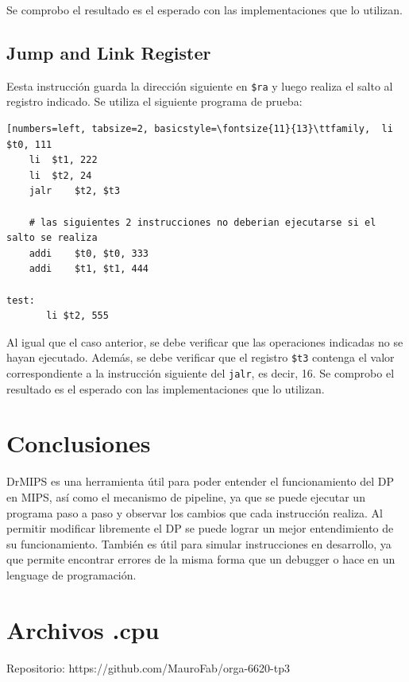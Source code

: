 \documentclass[11pt,a4paper, spanish]{article}
\begin{document}
Se comprobo el resultado es el esperado con las implementaciones que lo utilizan.

\subsection{Jump and Link Register}

Eesta instrucción guarda la dirección siguiente en \texttt{\$ra} y luego realiza el salto al registro
indicado. Se utiliza el siguiente programa de prueba:

\begin{lstlisting}[numbers=left, tabsize=2, basicstyle=\fontsize{11}{13}\ttfamily, 	li	$t0, 111
	li	$t1, 222
	li	$t2, 24
	jalr	$t2, $t3

	# las siguientes 2 instrucciones no deberian ejecutarse si el salto se realiza
	addi	$t0, $t0, 333
	addi	$t1, $t1, 444

test:
       li $t2, 555
\end{lstlisting}

Al igual que el caso anterior, se debe verificar que las operaciones indicadas no se hayan ejecutado.
Además, se debe verificar que el registro \texttt{\$t3} contenga el valor correspondiente a la instrucción siguiente del \texttt{jalr}, es decir, 16.
Se comprobo el resultado es el esperado con las implementaciones que lo utilizan.

\section{Conclusiones}

DrMIPS es una herramienta útil para poder entender el funcionamiento del DP en MIPS, así
como el mecanismo de pipeline, ya que se puede ejecutar un programa paso a paso y observar los cambios
que cada instrucción realiza. Al permitir modificar libremente el DP se puede lograr un mejor
entendimiento de su funcionamiento. También es útil para simular instrucciones en 
desarrollo, ya que permite encontrar errores de la misma forma que un debugger o hace
en un lenguage de programación.


\newpage

\section{Archivos .cpu}

Repositorio: https://github.com/MauroFab/orga-6620-tp3
\end{document}
